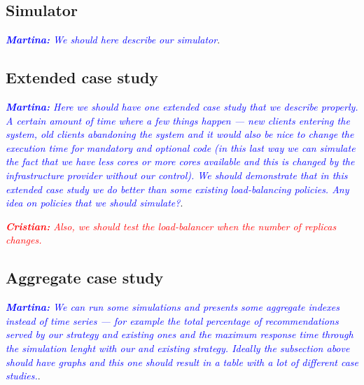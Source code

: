 \subsection{Simulator}

\textcolor{blue}{\textit{\textbf{Martina:} We should here describe our
    simulator}}.

\subsection{Extended case study}

\textcolor{blue}{\textit{\textbf{Martina:} Here we should have one
    extended case study that we describe properly. A certain amount of
    time where a few things happen --- new clients entering the
    system, old clients abandoning the system and it would also be
    nice to change the execution time for mandatory and optional code
    (in this last way we can simulate the fact that we have less cores
    or more cores available and this is changed by the infrastructure
    provider without our control). We should demonstrate that in this
    extended case study we do better than some existing load-balancing
    policies. Any idea on policies that we should simulate?}}.

\textcolor{red}{\textit{\textbf{Cristian:} Also, we should test the load-balancer
	when the number of replicas changes.}}

\subsection{Aggregate case study}

\textcolor{blue}{\textit{\textbf{Martina:} We can run some simulations
    and presents some aggregate indexes instead of time series --- for
    example the total percentage of recommendations served by our
    strategy and existing ones and the maximum response time through
    the simulation lenght with our and existing strategy. Ideally the
    subsection above should have graphs and this one should result in
    a table with a lot of different case studies.}}.



